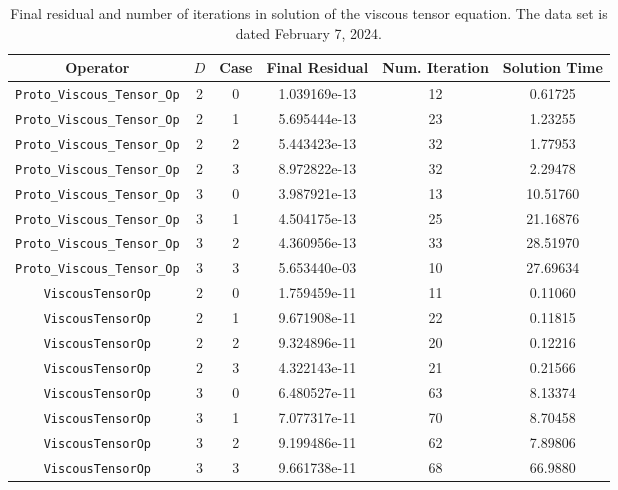 \documentclass{article}
\begin{document}
\begin{small}
\begin{table}
\begin{center}
\begin{tabular}{|c|c|c|c|c||c|} \hline
 Operator                   & $D$ & Case & Final Residual &
 Num. Iteration & Solution Time\\
\hline
 {\tt Proto\_Viscous\_Tensor\_Op} & 2   & 0    & 1.039169e-13   & 12  & 0.61725  \\
 {\tt Proto\_Viscous\_Tensor\_Op} & 2   & 1    & 5.695444e-13   & 23  & 1.23255  \\
 {\tt Proto\_Viscous\_Tensor\_Op} & 2   & 2    & 5.443423e-13   & 32  & 1.77953  \\
 {\tt Proto\_Viscous\_Tensor\_Op} & 2   & 3    & 8.972822e-13   & 32  & 2.29478  \\
 {\tt Proto\_Viscous\_Tensor\_Op} & 3   & 0    & 3.987921e-13   & 13  & 10.51760  \\
 {\tt Proto\_Viscous\_Tensor\_Op} & 3   & 1    & 4.504175e-13   & 25  & 21.16876  \\
 {\tt Proto\_Viscous\_Tensor\_Op} & 3   & 2    & 4.360956e-13   & 33  & 28.51970  \\
 {\tt Proto\_Viscous\_Tensor\_Op} & 3   & 3    & 5.653440e-03   & 10  & 27.69634  \\
\hline                                                      
 {\tt ViscousTensorOp}            & 2   & 0    & 1.759459e-11   & 11  & 0.11060  \\
 {\tt ViscousTensorOp}            & 2   & 1    & 9.671908e-11   & 22  & 0.11815  \\
 {\tt ViscousTensorOp}            & 2   & 2    & 9.324896e-11   & 20  & 0.12216  \\
 {\tt ViscousTensorOp}            & 2   & 3    & 4.322143e-11   & 21  & 0.21566  \\
 {\tt ViscousTensorOp}            & 3   & 0    & 6.480527e-11   & 63  & 8.13374  \\
 {\tt ViscousTensorOp}            & 3   & 1    & 7.077317e-11   & 70  & 8.70458  \\
 {\tt ViscousTensorOp}            & 3   & 2    & 9.199486e-11   & 62  & 7.89806  \\
 {\tt ViscousTensorOp}            & 3   & 3    & 9.661738e-11   & 68  & 66.9880  \\
\hline
\end{tabular}
\end{center}
\label{tab::viscous2}
\caption
    {
      Final residual and number of iterations in solution of the
      viscous tensor equation.
      The data set is dated February 7, 2024.
    }
\end{table}
\end{small}
\end{document}
